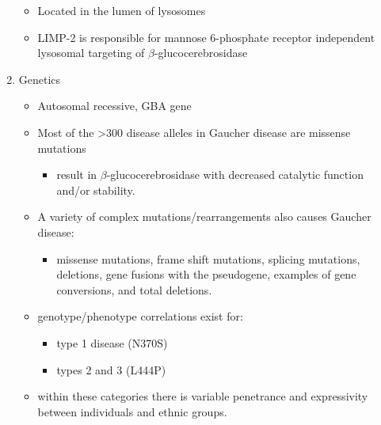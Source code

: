 \documentclass{scrartcl}
\begin{document}
\begin{enumerate}
\begin{itemize}
\item Located in the lumen of lysosomes
\item LIMP-2 is responsible for mannose 6-phosphate receptor independent
lysosomal targeting of \(\beta\)-glucocerebrosidase
\end{itemize}

\item Genetics
\label{sec:orgb8b0ac7}
\begin{itemize}
\item Autosomal recessive, GBA gene
\item Most of the >300 disease alleles in Gaucher disease are missense
mutations
\begin{itemize}
\item result in \(\beta\)-glucocerebrosidase with decreased catalytic
function and/or stability.
\end{itemize}
\item A variety of complex mutations/rearrangements also causes Gaucher
disease:
\begin{itemize}
\item missense mutations, frame shift mutations, splicing mutations,
deletions, gene fusions with the pseudogene, examples of gene
conversions, and total deletions.
\end{itemize}
\item genotype/phenotype correlations exist for:
\begin{itemize}
\item type 1 disease (N370S)
\item types 2 and 3 (L444P)
\end{itemize}
\item within these categories there is variable penetrance and
expressivity between individuals and ethnic groups.
\end{itemize}
\end{enumerate}
\end{document}
